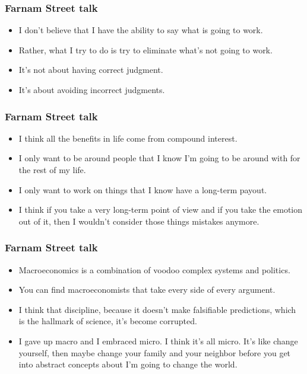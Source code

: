\begin{frame}[fragile]\frametitle{Farnam Street talk}

\begin{itemize}
\item I don’t believe that I have the ability to say what is going to work. 
\item Rather, what I try to do is try to eliminate what’s not going to work. 
\item It’s not about having correct judgment. 
\item It’s about avoiding incorrect judgments.
\end{itemize}

\end{frame}

\begin{frame}[fragile]\frametitle{Farnam Street talk}

\begin{itemize}
\item I think all the benefits in life come from compound interest. 
\item I only want to be around people that I know I’m going to be around with for the rest of my life. 
\item I only want to work on things that I know have a long-term payout.
\item I think if you take a very long-term point of view and if you take the emotion out of it, then I wouldn’t consider those things mistakes anymore.
\end{itemize}

\end{frame}

\begin{frame}[fragile]\frametitle{Farnam Street talk}

\begin{itemize}
\item Macroeconomics is a combination of voodoo complex systems and politics. 
\item You can find macroeconomists that take every side of every argument. 
\item I think that discipline, because it doesn’t make falsifiable predictions, which is the hallmark of science, it’s become corrupted.
\item I gave up macro and I embraced micro. I think it’s all micro. It’s like change yourself, then maybe change your family and your neighbor before you get into abstract concepts about I’m going to change the world.
\end{itemize}

\end{frame}

